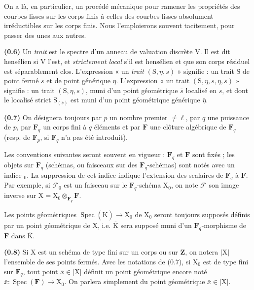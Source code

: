 \documentclass[11pt,leqno]{article}
\begin{document}
On a là, en particulier, un procédé mécanique pour ramener les propriétés des courbes lisses sur les corps finis à celles des courbes lisses absolument irréductibles sur les corps finis. Nous l’emploierons souvent tacitement, pour passer des unes aux autres.

\textbf{(0.6)} Un \textit{trait} est le spectre d’un anneau de valuation discrète \(\mathrm{V}\). Il est dit hensélien si \(\mathrm{V}\) l’est, et \textit{strictement local} s’il est hensélien et que son corps résiduel est séparablement clos. L’expression « un \textit{trait} \((\mathrm{S},\eta,s)\) » signifie : un trait \(\mathrm{S}\) de point fermé \(s\) et de point générique \(\eta\). L’expression « un trait \((\mathrm{S},\eta,s,\bar\eta,\bar s)\) » signifie : un trait \((\mathrm{S},\eta,s)\), muni d’un point géométrique \(\bar s\) localisé en \(s\), et dont le localisé strict \(\mathrm{S}_{(\bar s)}\) est muni d’un point géométrique générique \(\bar\eta\).

\textbf{(0.7)} On désignera toujours par \(p\) un nombre premier \(\ne\ell\), par \(q\) une puissance de \(p\), par \(\mathbf{F}_q\) un corps fini à \(q\) éléments et par \(\mathbf{F}\) une clôture algébrique de \(\mathbf{F}_q\) (resp. de \(\mathbf{F}_p\), si \(\mathbf{F}_q\) n’a pas été introduit).

Les conventions suivantes seront souvent en vigueur : \(\mathbf{F}_q\) et \(\mathbf{F}\) sont fixés ; les objets sur \(\mathbf{F}_q\) (schémas, ou faisceaux sur des \(\mathbf{F}_q\)-schémas) sont notés avec un indice \({}_0\). La suppression de cet indice indique l’extension des scalaires de \(\mathbf{F}_q\) à \(\mathbf{F}\). Par exemple, si \(\mathscr{F}_0\) est un faisceau sur le \(\mathbf{F}_q\)-schéma \(\mathrm{X}_0\), on note \(\mathscr{F}\) son image inverse sur \(\mathrm{X}=\mathrm{X}_0\otimes_{\mathbf{F}_q}\mathbf{F}\).

Les points géométriques \(\operatorname{Spec}(\overline{\mathrm{K}})\to\mathrm{X}_0\) de \(\mathrm{X}_0\) seront toujours supposés définis par un point géométrique de \(\mathrm{X}\), i.e. \(\overline{\mathrm{K}}\) sera supposé muni d’un \(\mathbf{F}_q\)-morphisme de \(\mathbf{F}\) dans \(\overline{\mathrm{K}}\).

\textbf{(0.8)} Si \(\mathrm{X}\) est un schéma de type fini sur un corps ou sur \(\mathbf{Z}\), on notera \(|\mathrm{X}|\) l’ensemble de ses points fermés. Avec les notations de (0.7), si \(\mathrm{X}_0\) est de type fini sur \(\mathbf{F}_q\), tout point \(\bar x\in|\mathrm{X}|\) définit un point géométrique encore noté \(\bar x:\operatorname{Spec}(\mathbf{F})\to\mathrm{X}_0\). On parlera simplement du point géométrique \(\bar x\in|\mathrm{X}|\).
\end{document}

